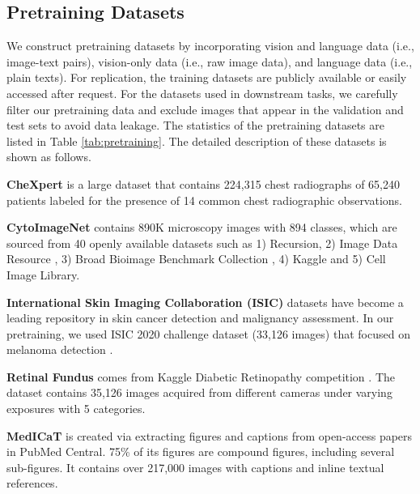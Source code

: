 \documentclass[10pt]{article} \usepackage[preprint]{tmlr}
\begin{document}
\subsection{Pretraining Datasets}
We construct pretraining datasets by incorporating vision and language data (i.e., image-text pairs), vision-only data (i.e., raw image data), and language data (i.e., plain texts). For replication, the training datasets are publicly available or easily accessed after request. For the datasets used in downstream tasks, we carefully filter our pretraining data and exclude images that appear in the validation and test sets to avoid data leakage. The statistics of the pretraining datasets are listed in Table \ref{tab:pretraining}. The detailed description of these datasets is shown as follows.
\vspace{5pt}

\noindent \textbf{CheXpert} \citep{irvin2019chexpert} is a large dataset that contains 224,315 chest radiographs of 65,240 patients labeled for the presence of 14 common chest radiographic observations. 
\vspace{5pt}

\noindent \textbf{CytoImageNet} \citep{hua2021cytoimagenet} contains 890K microscopy images with 894 classes, which are sourced from 40 openly available datasets such as 1) Recursion, 2) Image Data Resource \citep{williams2017image}, 3) Broad Bioimage Benchmark Collection \citep{ljosa2012annotated}, 4) Kaggle and 5) Cell Image Library.
\vspace{5pt}

\noindent \textbf{International Skin Imaging Collaboration (ISIC)} datasets have become a leading repository in skin cancer detection and malignancy assessment. In our pretraining, we used ISIC 2020 challenge dataset (33,126 images) that focused on melanoma detection \citep{rotemberg2021patient}.
\vspace{5pt}

\noindent \textbf{Retinal Fundus} comes from Kaggle Diabetic Retinopathy competition \citep{diabetic-retinopathy-detection}. The dataset contains 35,126 images acquired from different cameras under varying exposures with 5 categories.
\vspace{5pt}

\noindent \textbf{MedICaT} \citep{subramanian2020medicat} is created via extracting figures and captions from open-access papers in PubMed Central. 75\% of its figures are compound figures, including several sub-figures. It contains over 217,000 images with captions and inline textual references.
\vspace{5pt}
\end{document}
